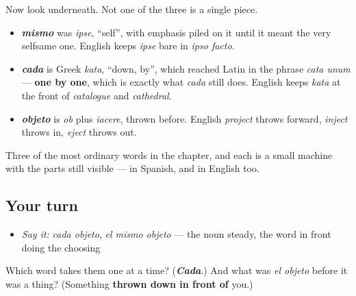 \begin{culture}
Now look underneath. Not one of the three is a single piece.

\begin{itemize}
\raggedright
  \item \emph{\textbf{mismo}} was \emph{ipse}, \textquotedblleft{}self\textquotedblright{}, with emphasis piled on it until it meant the very selfsame one. English keeps \emph{ipse} bare in \emph{ipso facto}.
  \item \emph{\textbf{cada}} is Greek \emph{kata}, \textquotedblleft{}down, by\textquotedblright{}, which reached Latin in the phrase \emph{cata unum} — \textbf{one by one}, which is exactly what \emph{cada} still does. English keeps \emph{kata} at the front of \emph{catalogue} and \emph{cathedral}.
  \item \emph{\textbf{objeto}} is \emph{ob} plus \emph{iacere}, thrown before. English \emph{project} throws forward, \emph{inject} throws in, \emph{eject} throws out.
\end{itemize}

Three of the most ordinary words in the chapter, and each is a small machine with the parts still visible — in Spanish, and in English too.
\end{culture}

\subsection*{Your turn}
\begin{itemize}
\raggedright
  \item \emph{Say it:} \emph{cada objeto}, \emph{el mismo objeto} — the noun steady, the word in front doing the choosing
\end{itemize}

\begin{tcolorbox}[breakable,colback=teal!4,colframe=teal!35!black,title={Before you move on}]
Which word takes them one at a time? (\emph{\textbf{Cada}}.) And what was \emph{el objeto} before it was a thing? (Something \textbf{thrown down in front of} you.)
\end{tcolorbox}
